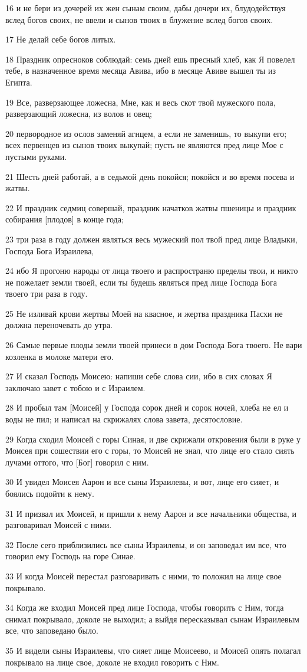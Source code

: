 \par 16 и не бери из дочерей их жен сынам своим, дабы дочери их, блудодействуя вслед богов своих, не ввели и сынов твоих в блужение вслед богов своих.
\par 17 Не делай себе богов литых.
\par 18 Праздник опресноков соблюдай: семь дней ешь пресный хлеб, как Я повелел тебе, в назначенное время месяца Авива, ибо в месяце Авиве вышел ты из Египта.
\par 19 Все, разверзающее ложесна, Мне, как и весь скот твой мужеского пола, разверзающий ложесна, из волов и овец;
\par 20 первородное из ослов заменяй агнцем, а если не заменишь, то выкупи его; всех первенцев из сынов твоих выкупай; пусть не являются пред лице Мое с пустыми руками.
\par 21 Шесть дней работай, а в седьмой день покойся; покойся и во время посева и жатвы.
\par 22 И праздник седмиц совершай, праздник начатков жатвы пшеницы и праздник собирания [плодов] в конце года;
\par 23 три раза в году должен являться весь мужеский пол твой пред лице Владыки, Господа Бога Израилева,
\par 24 ибо Я прогоню народы от лица твоего и распространю пределы твои, и никто не пожелает земли твоей, если ты будешь являться пред лице Господа Бога твоего три раза в году.
\par 25 Не изливай крови жертвы Моей на квасное, и жертва праздника Пасхи не должна переночевать до утра.
\par 26 Самые первые плоды земли твоей принеси в дом Господа Бога твоего. Не вари козленка в молоке матери его.
\par 27 И сказал Господь Моисею: напиши себе слова сии, ибо в сих словах Я заключаю завет с тобою и с Израилем.
\par 28 И пробыл там [Моисей] у Господа сорок дней и сорок ночей, хлеба не ел и воды не пил; и написал на скрижалях слова завета, десятословие.
\par 29 Когда сходил Моисей с горы Синая, и две скрижали откровения были в руке у Моисея при сошествии его с горы, то Моисей не знал, что лице его стало сиять лучами оттого, что [Бог] говорил с ним.
\par 30 И увидел Моисея Аарон и все сыны Израилевы, и вот, лице его сияет, и боялись подойти к нему.
\par 31 И призвал их Моисей, и пришли к нему Аарон и все начальники общества, и разговаривал Моисей с ними.
\par 32 После сего приблизились все сыны Израилевы, и он заповедал им все, что говорил ему Господь на горе Синае.
\par 33 И когда Моисей перестал разговаривать с ними, то положил на лице свое покрывало.
\par 34 Когда же входил Моисей пред лице Господа, чтобы говорить с Ним, тогда снимал покрывало, доколе не выходил; а выйдя пересказывал сынам Израилевым все, что заповедано было.
\par 35 И видели сыны Израилевы, что сияет лице Моисеево, и Моисей опять полагал покрывало на лице свое, доколе не входил говорить с Ним.

